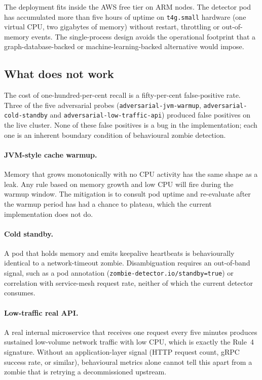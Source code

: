 \documentclass[11pt,a4paper,oneside]{article}
\begin{document}
The deployment fits inside the AWS free tier on ARM nodes. The detector
pod has accumulated more than five hours of uptime on
\texttt{t4g.small} hardware (one virtual CPU, two gigabytes of memory)
without restart, throttling or out-of-memory events. The single-process
design avoids the operational footprint that a graph-database-backed or
machine-learning-backed alternative would impose.

\subsection{What does not work}

The cost of one-hundred-per-cent recall is a fifty-per-cent false-positive
rate. Three of the five adversarial probes
(\texttt{adversarial-jvm-warmup}, \texttt{adversarial-cold-standby} and
\texttt{adversarial-low-traffic-api}) produced false positives on the
live cluster. None of these false positives is a bug in the
implementation; each one is an inherent boundary condition of behavioural
zombie detection.

\paragraph{JVM-style cache warmup.}
Memory that grows monotonically with no CPU activity has the same shape
as a leak. Any rule based on memory growth and low CPU will fire during
the warmup window. The mitigation is to consult pod uptime and
re-evaluate after the warmup period has had a chance to plateau, which
the current implementation does not do.

\paragraph{Cold standby.}
A pod that holds memory and emits keepalive heartbeats is
behaviourally identical to a network-timeout zombie. Disambiguation
requires an out-of-band signal, such as a pod annotation
(\texttt{zombie-detector.io/standby=true}) or correlation with
service-mesh request rate, neither of which the current detector
consumes.

\paragraph{Low-traffic real API.}
A real internal microservice that receives one request every five
minutes produces sustained low-volume network traffic with low CPU,
which is exactly the Rule~4 signature. Without an
application-layer signal (HTTP request count, gRPC success rate, or
similar), behavioural metrics alone cannot tell this apart from a
zombie that is retrying a decommissioned upstream.
\end{document}
